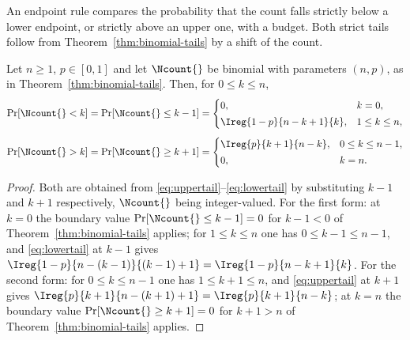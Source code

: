 
An endpoint rule compares the probability that the count falls strictly below
a lower endpoint, or strictly above an upper one, with a budget. Both strict
tails follow from Theorem~\ref{thm:binomial-tails} by a shift of the count.

\begin{corollary}\label{cor:tail-forms}
Let $n\ge1$, $p\in[0,1]$ and let $\Ncount{}$ be binomial with parameters
$(n,p)$, as in Theorem~\ref{thm:binomial-tails}. Then, for $0\le k\le n$,
\begin{equation}\label{eq:tails-used}
\begin{aligned}
  \Pr[\Ncount{}<k]&=\Pr[\Ncount{}\le k-1]
  =\begin{cases}0,&k=0,\\[2pt] \Ireg{1-p}{n-k+1}{k},&1\le k\le n,\end{cases}\\[4pt]
  \Pr[\Ncount{}>k]&=\Pr[\Ncount{}\ge k+1]
  =\begin{cases}\Ireg{p}{k+1}{n-k},&0\le k\le n-1,\\[2pt] 0,&k=n.\end{cases}
\end{aligned}
\end{equation}
\end{corollary}

\begin{proof}
Both are obtained from \eqref{eq:uppertail}--\eqref{eq:lowertail} by
substituting $k-1$ and $k+1$ respectively, $\Ncount{}$ being integer-valued.
For the first form: at $k=0$ the boundary value $\Pr[\Ncount{}\le k-1]=0$ for
$k-1<0$ of Theorem~\ref{thm:binomial-tails} applies; for $1\le k\le n$ one has
$0\le k-1\le n-1$, and \eqref{eq:lowertail} at $k-1$ gives
$\Ireg{1-p}{n-(k-1)}{(k-1)+1}=\Ireg{1-p}{n-k+1}{k}$. For the second form: for
$0\le k\le n-1$ one has $1\le k+1\le n$, and \eqref{eq:uppertail} at $k+1$
gives $\Ireg{p}{k+1}{n-(k+1)+1}=\Ireg{p}{k+1}{n-k}$; at $k=n$ the boundary
value $\Pr[\Ncount{}\ge k+1]=0$ for $k+1>n$ of Theorem~\ref{thm:binomial-tails} applies.
\end{proof}
